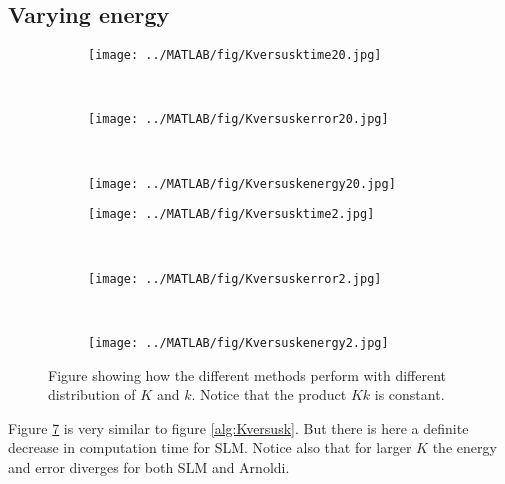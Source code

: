 \subsection{Varying energy}%
\begin{figure}[H]
        \centering
		\begin{subfigure}[b]{0.3\textwidth}
                \texttt{[image: ../MATLAB/fig/Kversusktime20.jpg]}
                \caption{  }
                \label{fig:Kversusktime20}
        \end{subfigure}
        ~
        \begin{subfigure}[b]{0.3\textwidth}
                \texttt{[image: ../MATLAB/fig/Kversuskerror20.jpg]}
                \caption{  }
                \label{fig:Kversuskerror20}
        \end{subfigure}
        ~
        \begin{subfigure}[b]{0.3\textwidth}
                \texttt{[image: ../MATLAB/fig/Kversuskenergy20.jpg]}
                \caption{  }
                \label{fig:Kversuskenergy20}
        \end{subfigure}        
        
        \begin{subfigure}[b]{0.3\textwidth}
                \texttt{[image: ../MATLAB/fig/Kversusktime2.jpg]}
                \caption{  }
                \label{fig:Kversusktime2}
        \end{subfigure}
        ~
        \begin{subfigure}[b]{0.3\textwidth}
                \texttt{[image: ../MATLAB/fig/Kversuskerror2.jpg]}
                \caption{  }
                \label{fig:Kversuskerror2}
        \end{subfigure}
        ~
        \begin{subfigure}[b]{0.3\textwidth}
                \texttt{[image: ../MATLAB/fig/Kversuskenergy2.jpg]}
                \caption{  }
                \label{fig:Kversuskenergy2}
        \end{subfigure}
        \caption{Figure showing how the different methods perform with different distribution of $K$ and $k$. Notice that the product $Kk$ is constant. }
        \label{fig:Kversusk2}
\end{figure}
Figure \ref{fig:Kversusk2} is very similar to figure \ref{alg:Kversusk}. But there is here a definite decrease in computation time for SLM. Notice also that for larger $K$ the energy and error diverges for both SLM and Arnoldi. 


